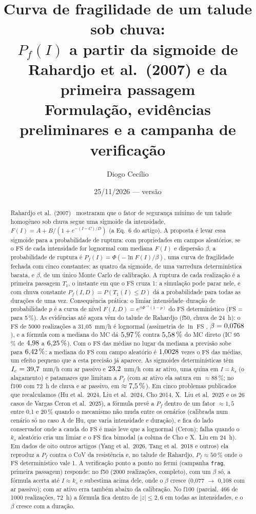 \documentclass[11pt,a4paper]{article}
\title{Curva de fragilidade de um talude sob chuva:\\ $P_f(I)$ a partir da sigmoide de Rahardjo et al.\ (2007) e da
primeira passagem\\ \large Formulação, evidências preliminares e a campanha de verificação}
\author{Diogo Cecílio}
\date{25/11/2026 --- versão \versao}
\newcommand{\Pf}{P_f}
\begin{document}
\maketitle
\begin{abstract}
Rahardjo et al.\ (2007)~\cite{rahardjo2007} mostraram que o fator de segurança mínimo de um talude homogêneo sob chuva segue uma sigmoide
da intensidade, $F(I) = A + B/(1 + e^{-(I-C)/D})$ (a Eq.~6 do artigo). A proposta é levar essa sigmoide para a
probabilidade de ruptura: com propriedades em campos aleatórios, se o FS de cada intensidade for lognormal com mediana
$F(I)$ e dispersão $\beta$, a probabilidade de ruptura é $\Pf(I) = \Phi(-\ln F(I)/\beta)$, uma curva de fragilidade
fechada com cinco constantes: as quatro da sigmoide, de uma varredura determinística barata, e $\beta$, de um único
Monte Carlo de calibração. A ruptura de cada realização é a primeira passagem $T_1$, o instante em que o FS cruza 1: a
simulação pode parar nele, e com chuva constante $\Pf(I, D) = P(T_1(I) \le D)$ dá a probabilidade para todas as
durações de uma vez. Consequência prática: o limiar intensidade--duração de probabilidade $p$ é a curva de nível
$F(I,D) = e^{\beta\,\Phi^{-1}(1-p)}$ do FS determinístico (FS = \nivelCinco{} para 5\,\%). As evidências até agora vêm
do talude de Rahardjo (f50, chuva de 24~h): o FS de 5000 realizações a 31,05~mm/h é lognormal (assimetria de $\ln$ FS
\assRef, $\beta = 0{,}0768$), e a fórmula com a mediana do MC dá $5{,}97\,\%$ contra $5{,}58\,\%$ do MC direto (IC
95\,\% de $4{,}98$ a $6{,}25\,\%$). Com o FS das médias no lugar da mediana a previsão sobe para $6{,}42\,\%$: a
mediana do FS com campo aleatório é $1{,}0028$ vezes o FS das médias, um efeito pequeno que a esta precisão já
aparece. As sigmoides determinísticas têm $I_c = 39{,}7$~mm/h com ar passivo e $23{,}2$~mm/h com ar ativo, uma
quina em $I = k_s$ (o alagamento) e patamares que limitam a $\Pf$ (com ar ativo ela satura em $\approx 88\,\%$; no f100
com 72~h de chuva e ar passivo, em $\approx 7{,}5\,\%$). Em cinco problemas publicados que recalculamos (Hu et al.\ 2024, Liu et al.\ 2024, Cho 2014, X.\ Liu et al.\ 2025 e
os 26 casos de Vargas Ceron et al.\ 2025), a fórmula prevê a $\Pf$ dentro de um fator $\approx 1{,}5$ entre 0,1 e
20\,\% quando o mecanismo não muda entre os cenários (calibrada num cenário só no caso A de Hu, que varia intensidade e
duração), e fica do lado conservador onde a cauda do FS é mais leve que a lognormal (Ceron); falha quando o $k_s$
aleatório cria um limiar e o FS fica bimodal (a coluna de Cho e X.\ Liu em 24~h). Em dados de oito outros artigos
(Yang et al.\ 2026, Tang et al.\ 2018 e outros) ela reproduz a $\Pf$ contra o CoV da resistência e, no talude de
Rahardjo, $\Pf \approx 50\,\%$ onde o FS determinístico vale 1. A verificação ponto a ponto no fermi (campanha
\texttt{frag}, primeira passagem) responde: no f50 (2000 realizações, completo), com um $\beta$ só, a fórmula acerta
até $I \approx k_s$ e subestima acima dele, onde o $\beta$ cresce (0,077 $\to$ 0,108 com ar passivo); com ar ativo
erra também abaixo da calibração. No f100 (parcial, 466 de 1000 realizações, 72~h) a fórmula fica dentro de $|z|
\le 2{,}6$ em todas as intensidades, e o $\beta$ cresce com a duração.
\end{abstract}
\tableofcontents
\end{document}
